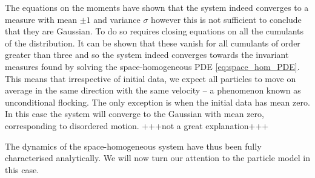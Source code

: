 \documentclass[11pt, a4paper, draft]{article}
\begin{document}
        The equations on the moments have shown that the system indeed converges to a measure with mean $\pm 1$ and variance $\sigma$ however this is not sufficient to conclude that they are Gaussian. To do so requires closing equations on all the cumulants of the distribution. It can be shown that these vanish for all cumulants of order greater than three and so the system indeed converges towards the invariant measures found by solving the space-homogeneous PDE \eqref{eq:space_hom_PDE}. This means that irrespective of initial data, we expect all particles to move on average in the same direction with the same velocity -- a phenomenon known as unconditional flocking. The only exception is when the initial data has mean zero. In this case the system will converge to the Gaussian with mean zero, corresponding to disordered motion. +++not a great explanation+++
        
        The dynamics of the space-homogeneous system have thus been fully characterised analytically. We will now turn our attention to the particle model in this case.
\end{document}
